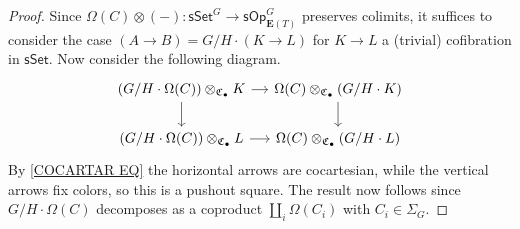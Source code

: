 \documentclass[a4paper,10pt
,draft
]{article}%
\numberwithin{equation}{section}
\numberwithin{figure}{section}
\newtheorem{lemma}[equation]{Lemma}%
\theoremstyle{definition} %
\newcommand{\sSet}{\ensuremath{\mathsf{sSet}}}%
\newcommand{\sOp}{\ensuremath{\mathsf{sOp}}}%
\newcommand{\1}{\ensuremath{\mathbbm 1}}%
\begin{document}
\begin{proof}
	Since $\Omega(C) \otimes (-) \colon \sSet^G \to \sOp^G_{\boldsymbol{E}(T)}$ preserves colimits, 
	it suffices to consider the case 
	$(A \to B) = G/H \cdot (K \to L)$ for $K \to L$ a (trivial) cofibration in $\sSet$.
	Now consider the following diagram.
\begin{equation}
\begin{tikzcd}[column sep = small, ampersand replacement = \&]
	\left(G/H \cdot \Omega(C)\right) \otimes_{\mathfrak{C}_{\bullet}} K 
	\arrow[r] \arrow[d]
\&
	\Omega(C) \otimes_{\mathfrak{C}_{\bullet}} \left(G/H \cdot K\right)
	\arrow[d]
\\
	\left(G/H \cdot \Omega(C)\right) \otimes_{\mathfrak{C}_{\bullet}} L
	\arrow[r] 
\&
	\Omega(C) \otimes_{\mathfrak{C}_{\bullet}} \left(G/H \cdot L\right)
\end{tikzcd}
\end{equation}
By \eqref{COCARTAR EQ} the horizontal arrows are cocartesian, while the vertical arrows fix colors, 
so this is a pushout square.
The result now follows since 
$G/H \cdot \Omega(C)$ decomposes as a coproduct 
$\amalg_i \Omega(C_i)$ with $C_i\in \Sigma_G$.
\end{proof}



%
\end{document}
